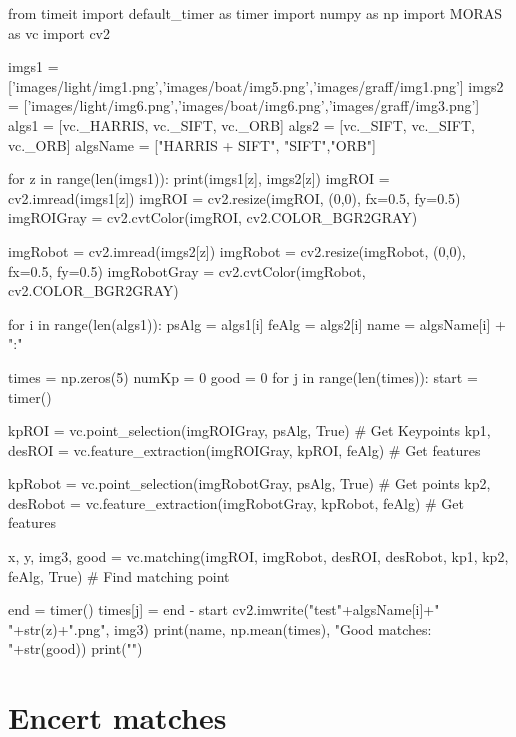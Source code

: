 \begin{python}
from timeit import default_timer as timer
import numpy as np
import MORAS as vc
import cv2

imgs1 = ['images/light/img1.png','images/boat/img5.png','images/graff/img1.png']
imgs2 = ['images/light/img6.png','images/boat/img6.png','images/graff/img3.png']
algs1 = [vc._HARRIS, vc._SIFT, vc._ORB]
algs2 = [vc._SIFT, vc._SIFT, vc._ORB]
algsName = ["HARRIS + SIFT", "SIFT","ORB"]

for z in range(len(imgs1)):
	print(imgs1[z], imgs2[z])
	imgROI = cv2.imread(imgs1[z])
	imgROI = cv2.resize(imgROI, (0,0), fx=0.5, fy=0.5)
	imgROIGray = cv2.cvtColor(imgROI, cv2.COLOR_BGR2GRAY)

	imgRobot = cv2.imread(imgs2[z])
	imgRobot = cv2.resize(imgRobot, (0,0), fx=0.5, fy=0.5)
	imgRobotGray = cv2.cvtColor(imgRobot, cv2.COLOR_BGR2GRAY)

	for i in range(len(algs1)):
		psAlg = algs1[i]
		feAlg = algs2[i]
		name = algsName[i] + ":"
		
		times = np.zeros(5)
		numKp = 0
		good = 0
		for j in range(len(times)):
			start = timer()

			kpROI = vc.point_selection(imgROIGray, psAlg, True)				# Get Keypoints
			kp1, desROI = vc.feature_extraction(imgROIGray, kpROI, feAlg)	# Get features

			kpRobot = vc.point_selection(imgRobotGray, psAlg, True)					# Get points
			kp2, desRobot = vc.feature_extraction(imgRobotGray, kpRobot, feAlg)	# Get features

			x, y, img3, good = vc.matching(imgROI, imgRobot, desROI, desRobot,
				kp1, kp2, feAlg, True)	# Find matching point

			end = timer()
			times[j] = end - start
		cv2.imwrite("test"+algsName[i]+" "+str(z)+".png", img3)
		print(name, np.mean(times), "Good matches: "+str(good))
	print("\n")
\end{python}

\section{Encert matches}

